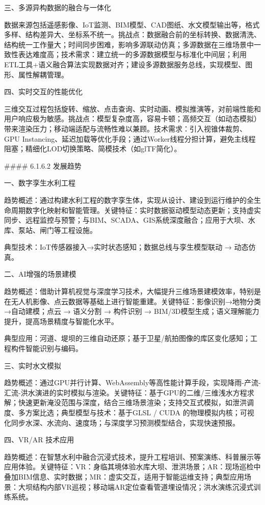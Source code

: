 三、多源异构数据的融合与一体化

数据来源包括遥感影像、IoT监测、BIM模型、CAD图纸、水文模型输出等，格式多样、结构差异大、坐标系不统一。挑战点：数据融合前的坐标转换、数据清洗、结构统一工作量大；时间同步困难，影响多源联动仿真；多源数据在三维场景中一致性表达难度高；技术需求：建立统一的多源数据模型与标准化中间层；利用ETL工具+语义融合算法实现数据对齐；建设多源数据服务总线，实现模型、图形、属性解耦管理。

四、实时交互的性能优化

三维交互过程包括旋转、缩放、点击查询、实时动画、模拟推演等，对前端性能和用户响应极为敏感。挑战点：模型复杂度高，容易卡顿；高频交互（如动态模拟）带来渲染压力；移动端适配与流畅性难以兼顾。技术需求：引入视锥体裁剪、GPU Instancing、延迟加载等优化手段；通过Worker线程分担计算，避免主线程阻塞；精细化LOD切换策略、简模技术（如glTF简化）。

\#\#\#\# 6.1.6.2 发展趋势

一、数字孪生水利工程

趋势概述：通过构建水利工程的数字孪生体，实现从设计、建设到运行维护的全生命周期数字化映射和智能管理。关键特征：实时数据驱动模型动态更新；支持虚实同步、远程监控与预警；与BIM、SCADA、GIS系统深度融合；应用于大坝、水库、泵站、闸门等工程设施。

典型技术：IoT传感器接入→实时状态感知；数据总线与孪生模型联动 → 动态仿真。

二、AI增强的场景建模

趋势概述：借助计算机视觉与深度学习技术，大幅提升三维场景建模效率，特别是在无人机影像、点云数据等基础上进行智能重建。关键特征：影像识别→地物分类→自动建模；点云 → 语义分割 → 构件识别 → BIM/3D模型生成；语义理解能力提升，提高场景精度与智能化水平。

典型应用：河道、堤坝的三维自动还原；基于卫星/航拍图像的库区变化感知；工程构件智能识别与编码。

三、实时水文模拟

趋势概述：通过GPU并行计算、WebAssembly等高性能计算手段，实现降雨-产流-汇流-洪水演进的实时模拟与渲染。关键特征：基于GPU的二维/三维浅水方程求解；快速更新淹没范围与深度，结合三维场景渲染；支持交互式模拟，如泄洪调度、多方案比选；典型模型与技术：基于GLSL / CUDA 的物理模拟内核；可视化同步水深、水流向、速度场；与深度学习预测模型结合，实现快速预报。

四、VR/AR 技术应用

趋势概述：在智慧水利中融合沉浸式技术，提升工程培训、预案演练、科普展示等应用体验。关键特征：VR：身临其境体验水库大坝、泄洪场景；AR：现场巡检中叠加BIM信息、实时数据；MR：虚实交互，适用于智能运维支持；典型应用场景：大坝结构内部VR巡视；移动端AR定位查看管道埋设情况；洪水演练沉浸式训练系统。

